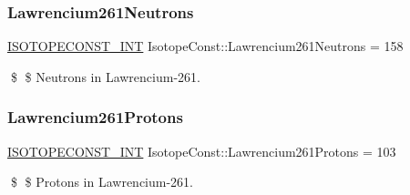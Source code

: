 \subsubsection{\texorpdfstring{Lawrencium261\+Neutrons}{Lawrencium261Neutrons}}
{\footnotesize\ttfamily \mbox{\hyperlink{group___isotope_const-_macros_ga5f18360b3e99483a35c32d789e62621c}{I\+S\+O\+T\+O\+P\+E\+C\+O\+N\+S\+T\+\_\+\+I\+NT}} Isotope\+Const\+::\+Lawrencium261\+Neutrons = 158}

\$ \$ Neutrons in Lawrencium-\/261. \mbox{\label{group___isotope_const-_lawrencium-_lr261_ga5f0646ddf594db129cbd03e931539ce9}} 
\subsubsection{\texorpdfstring{Lawrencium261\+Protons}{Lawrencium261Protons}}
{\footnotesize\ttfamily \mbox{\hyperlink{group___isotope_const-_macros_ga5f18360b3e99483a35c32d789e62621c}{I\+S\+O\+T\+O\+P\+E\+C\+O\+N\+S\+T\+\_\+\+I\+NT}} Isotope\+Const\+::\+Lawrencium261\+Protons = 103}

\$ \$ Protons in Lawrencium-\/261. 